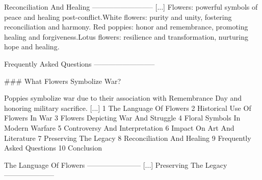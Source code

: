 \documentclass[12pt]{article}
\begin{document}
Reconciliation And Healing
-------------------------- [...] Flowers: powerful symbols of peace and healing post-conflict.White flowers: purity and unity, fostering reconciliation and harmony.
Red poppies: honor and remembrance, promoting healing and forgiveness.Lotus flowers: resilience and transformation, nurturing hope and healing.

Frequently Asked Questions
--------------------------

\#\#\# What Flowers Symbolize War?

Poppies symbolize war due to their association with Remembrance Day and honoring military sacrifice. [...] 1 The Language Of Flowers
   2 Historical Use Of Flowers In War
   3 Flowers Depicting War And Struggle
   4 Floral Symbols In Modern Warfare
   5 Controversy And Interpretation
   6 Impact On Art And Literature
   7 Preserving The Legacy
   8 Reconciliation And Healing
   9 Frequently Asked Questions
   10 Conclusion

The Language Of Flowers
----------------------- [...] Preserving The Legacy
---------------------
\end{document}
